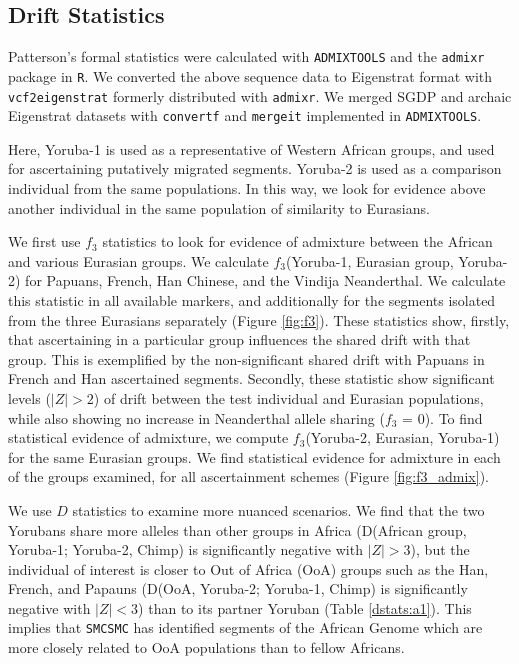 \subsection{Drift Statistics}

Patterson's formal statistics were calculated with {\tt ADMIXTOOLS} \cite{Patterson2012} and the {\tt admixr} package \cite{Petr2019} in {\tt R}. We converted the above sequence data to Eigenstrat format with {\tt vcf2eigenstrat} %
formerly distributed with {\tt admixr}. We merged SGDP and archaic Eigenstrat datasets with {\tt convertf} and {\tt mergeit} implemented in {\tt ADMIXTOOLS}. 

Here, Yoruba-1 is used as a representative of Western African groups, and used for ascertaining putatively migrated segments. Yoruba-2 is used as a comparison individual from the same populations. In this way, we look for evidence above another individual in the same population of similarity to Eurasians.

We first use $f_3$ statistics to look for evidence of admixture between the African and various Eurasian groups. We calculate $f_3$(Yoruba-1, Eurasian group, Yoruba-2) for Papuans, French, Han Chinese, and the Vindija Neanderthal. We calculate this statistic in all available markers, and additionally for the segments isolated from the three Eurasians separately (Figure \ref{fig:f3}). These statistics show, firstly, that ascertaining in a particular group influences the shared drift with that group. This is exemplified by the non-significant shared drift with Papuans in French and Han ascertained segments. Secondly, these statistic show significant levels ($|Z|>2$) of drift between the test individual and Eurasian populations, while also showing no increase in Neanderthal allele sharing ($f_3$ = 0). To find statistical evidence of admixture, we compute $f_3$(Yoruba-2, Eurasian, Yoruba-1) for the same Eurasian groups. We find statistical evidence for admixture in each of the groups examined, for all ascertainment schemes (Figure \ref{fig:f3_admix}). 

We use $D$ statistics to examine more nuanced scenarios. We find that the two Yorubans share more alleles than other groups in Africa (D(African group, Yoruba-1; Yoruba-2, Chimp) is significantly negative with $|Z|>3$), but the individual of interest is closer to Out of Africa (OoA) groups such as the Han, French, and Papauns (D(OoA, Yoruba-2; Yoruba-1, Chimp) is significantly negative with $|Z|<3$) than to its partner Yoruban (Table \ref{dstats:a1}). This implies that {\tt SMCSMC} has identified segments of the African Genome which are more closely related to OoA populations than to fellow Africans.   


